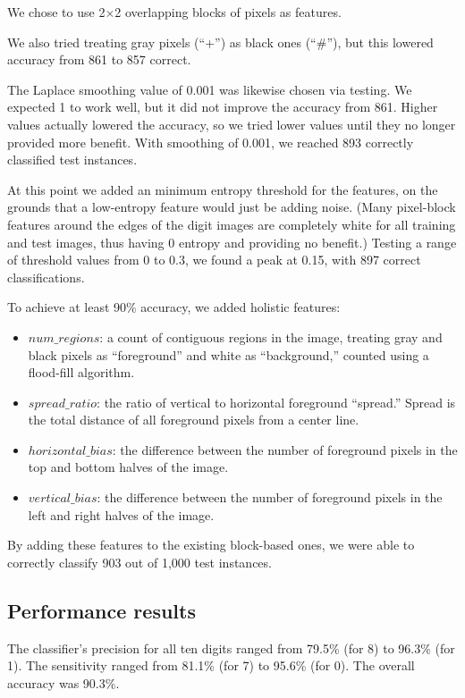 \documentclass[11pt]{article}
\begin{document}
We chose to use 2$\times$2 overlapping blocks of pixels as features.

We also tried treating gray pixels (``+'') as black ones (``\#''), but this lowered
accuracy from 861 to 857 correct.

The Laplace smoothing value of 0.001 was likewise chosen via testing. We expected 1 to
work well, but it did not improve the accuracy from 861. Higher values actually lowered
the accuracy, so we tried lower values until they no longer provided more benefit. With
smoothing of 0.001, we reached 893 correctly classified test instances.

At this point we added an minimum entropy threshold for the features, on the grounds
that a low-entropy feature would just be adding noise. (Many pixel-block features around
the edges of the digit images are completely white for all training and test images,
thus having 0 entropy and providing no benefit.) Testing a range of threshold values from
0 to 0.3, we found a peak at 0.15, with 897 correct classifications.

To achieve at least 90\% accuracy, we added holistic features:

\begin{itemize}[noitemsep]
\item $num\_regions$: a count of contiguous regions in the image, treating gray and black
pixels as ``foreground'' and white as ``background,'' counted using a flood-fill algorithm.
\item $spread\_ratio$: the ratio of vertical to horizontal foreground ``spread.'' Spread
is the total distance of all foreground pixels from a center line.
\item $horizontal\_bias$: the difference between the number of foreground pixels in the
top and bottom halves of the image.
\item $vertical\_bias$: the difference between the number of foreground pixels in the
left and right halves of the image.
\end{itemize}

By adding these features to the existing block-based ones, we were able to correctly
classify 903 out of 1,000 test instances.

\subsection{Performance results}

The classifier's precision for all ten digits ranged from 79.5\% (for 8) to 96.3\% (for 1).
The sensitivity ranged from 81.1\% (for 7) to 95.6\% (for 0). The overall accuracy was 90.3\%.
\end{document}
